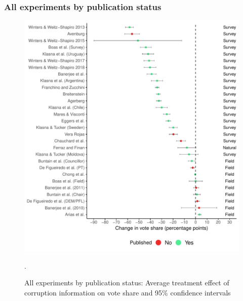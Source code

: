 \documentclass[usenames,dvipsnames]{beamer}
\begin{document}
\begin{frame}[label=all_published, noframenumbering]
\frametitle{All experiments by publication status \hyperlink{pub_bias}{}}

\begin{figure}[!htb]
\begin{centering}
\vspace{-0.2cm}
\includegraphics[scale=0.51]{../figs/published.pdf}
\caption{All experiments by publication status: Average treatment effect of corruption information on vote share and 95\% confidence intervals}.
\label{fig: funnel_re_survey}
\end{centering}
\end{figure}

\end{frame}

\end{document}
